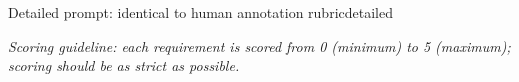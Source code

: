 \documentclass[11pt]{article}
\begin{document}
\begin{table}[t]
\begin{prompttextbox}{Detailed prompt: identical to human annotation rubric}{detailed}
\begin{minipage}[t]{0.47\linewidth}
\medskip\textit{Scoring guideline: each requirement is scored from 0 (minimum) to 5 (maximum); scoring should be as strict as possible.}
\end{minipage}
\end{prompttextbox}
\end{table}
\end{document}
